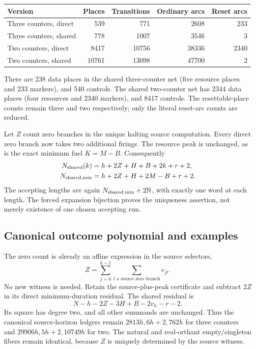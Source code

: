 \documentclass[11pt,letterpaper]{article}
\theoremstyle{definition}
\theoremstyle{remark}
\newcommand{\N}{\mathbb N}
\begin{document}
\begin{center}\small
\begin{tabular}{lrrrr}
\toprule
Version & Places & Transitions & Ordinary arcs & Reset arcs\\\midrule
Three counters, direct & 539 & 771 & 2608 & 233\\
Three counters, shared & 778 & 1007 & 3546 & 3\\
Two counters, direct & 8417 & 10756 & 38336 & 2340\\
Two counters, shared & 10761 & 13098 & 47700 & 2\\\bottomrule
\end{tabular}
\end{center}
There are 238 data places in the shared three-counter net (five resource places and 233 markers), and 540 controls. The shared two-counter net has 2344 data places (four resources and 2340 markers), and 8417 controls. The resettable-place counts remain three and two respectively; only the literal reset-arc counts are reduced.

Let $Z$ count zero branches in the unique halting source computation. Every direct zero branch now takes two additional firings. The resource peak is unchanged, as is the exact minimum fuel $K=M-B$. Consequently
\begin{align*}
 N_{\rm shared}(k)&=h+2Z+H+B+2k+r+2,\\
 N_{{\rm shared},\min}&=h+2Z+H+2M-B+r+2.
\end{align*}
The accepting lengths are again $N_{{\rm shared},\min}+2\N$, with exactly one word at each length. The forced expansion bijection proves the uniqueness assertion, not merely existence of one chosen accepting run.

\subsection{Canonical outcome polynomial and examples}
The zero count is already an affine expression in the source selectors,
\[
 Z=\sum_{j=0}^{h-1}\sum_{t\text{ a source zero branch}}e_{jt}.
\]
No new witness is needed. Retain the source-plus-peak certificate and subtract $2Z$ in its direct minimum-duration residual. The shared residual is
\[
 N-h-2Z-3H+B-2v_h-r-2.
\]
Its square has degree two, and all other summands are unchanged. Thus the canonical source-horizon ledgers remain $2813h,6h+2,762h$ for three counters and $29906h,5h+2,10749h$ for two. The natural and real-orthant empty/singleton fibers remain identical, because $Z$ is uniquely determined by the source witness.
\end{document}
